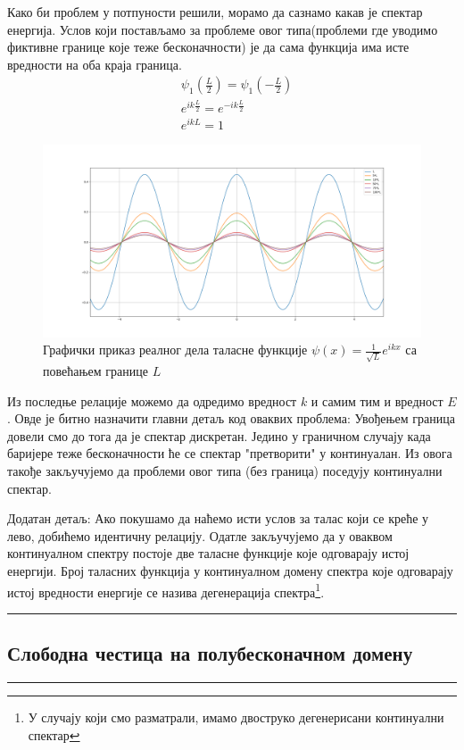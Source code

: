 \documentclass{tufte-handout} %
\theoremstyle{definition}
\theoremstyle{remark}
\begin{document}
Како би проблем у потпуности решили, морамо да сазнамо какав је спектар енергија. Услов који постављамо за проблеме овог типа(проблеми где уводимо фиктивне границе које теже бесконачности) је да сама функција има исте вредности на оба краја граница.
\begin{align*}
	&\psi_1\left(\frac{L}{2}\right)=\psi_1\left(-\frac{L}{2}\right)\\
	&e^{ik\frac{L}{2}}=e^{-ik\frac{L}{2}}\\
	&e^{ikL}=1
\end{align*}
\begin{figure}[h!]
	\centering
	\includegraphics[width=1\textwidth]{grafik_kosinus.png}
	\caption{Графички приказ реалног дела таласне функције $\psi(x)=\frac{1}{\sqrt{L}}e^{ikx}$ са повећањем границе $L$}
\end{figure}
Из последње релације можемо да одредимо вредност $k$ и самим тим и вредност $E$. Овде је битно назначити главни детаљ код оваквих проблема: Увођењем граница довели смо до тога да је спектар дискретан. Једино у граничном случају када баријере теже бесконачности ће се спектар "претворити" у континуалан. Из овога такође закључујемо да проблеми овог типа (без граница) поседују континуални спектар.\par
Додатан детаљ: Ако покушамо да наћемо исти услов за талас који се креће у лево, добићемо идентичну релацију. Одатле закључујемо да у оваквом континуалном спектру постоје две таласне функције које одговарају истој енергији. Број таласних функција у континуалном домену спектра које одговарају истој вредности енергије се назива дегенерација спектра\footnote{У случају који смо разматрали, имамо двоструко дегенерисани континуални спектар}.
\vspace{3em}
\hrule
\subsection*{Слободна честица на полубесконачном домену}
\hrule
\vspace{1em}
\end{document}
